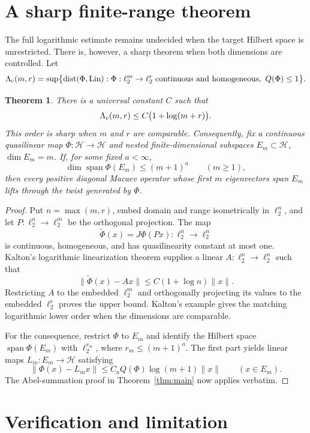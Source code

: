 \documentclass[11pt]{article}
\newtheorem{theorem}{Theorem}
\newcommand{\Hh}{\mathcal H}
\newcommand{\Qlin}{Q}
\newcommand{\Lin}{\operatorname{Lin}}
\newcommand{\dist}{\operatorname{dist}}
\newcommand{\spanop}{\operatorname{span}}
\begin{document}
\section{A sharp finite-range theorem}

The full logarithmic estimate remains undecided when the target Hilbert space
is unrestricted.  There is, however, a sharp theorem when both dimensions are
controlled.  Let
\[
 \Lambda_{\rm c}(m,r)=\sup\bigl\{\dist(\Phi,\Lin):
 \Phi:\ell_2^m\to\ell_2^r\text{ continuous and homogeneous},\
 \Qlin(\Phi)\leq1\bigr\}.
\]

\begin{theorem}\label{thm:finite-range}
There is a universal constant $C$ such that
\[
 \Lambda_{\rm c}(m,r)\leq C\bigl(1+\log(m+r)\bigr).
\]
This order is sharp when $m$ and $r$ are comparable.  Consequently, fix a
continuous quasilinear map $\Phi:\Hh\to\Hh$ and nested finite-dimensional
subspaces $E_m\subset\Hh$, $\dim E_m=m$.  If, for some fixed $a<\infty$,
\[
 \dim\spanop\Phi(E_m)\leq(m+1)^a\qquad(m\geq1),
\]
then every positive diagonal Macaev operator whose first $m$ eigenvectors span
$E_m$ lifts through the twist generated by $\Phi$.
\end{theorem}

\begin{proof}
Put $n=\max(m,r)$, embed domain and range isometrically in $\ell_2^n$, and let
$P:\ell_2^n\to\ell_2^m$ be the orthogonal projection.  The map
\[
 \widetilde\Phi(x)=J\Phi(Px):\ell_2^n\longrightarrow\ell_2^n
\]
is continuous, homogeneous, and has quasilinearity constant at most one.
Kalton's logarithmic linearization theorem
\cite[Theorem~2.2]{Kalton2002} supplies a linear $A:\ell_2^n\to\ell_2^n$
such that
\[
 \|\widetilde\Phi(x)-Ax\|
 \leq C(1+\log n)\|x\|.
\]
Restricting $A$ to the embedded $\ell_2^m$ and orthogonally projecting its
values to the embedded $\ell_2^r$ proves the upper bound.  Kalton's example
\cite[Proposition~2.1]{Kalton2002} gives the matching logarithmic lower order
when the dimensions are comparable.

For the consequence, restrict $\Phi$ to $E_m$ and identify the Hilbert space
$\spanop\Phi(E_m)$ with $\ell_2^{r_m}$, where $r_m\leq(m+1)^a$.  The first
part yields linear maps $L_m:E_m\to\Hh$ satisfying
\[
 \|\Phi(x)-L_mx\|
 \leq C_a\Qlin(\Phi)\log(m+1)\|x\|\qquad(x\in E_m).
\]
The Abel-summation proof in Theorem~\ref{thm:main} now applies verbatim.
\end{proof}

\section{Verification and limitation}
\end{document}
